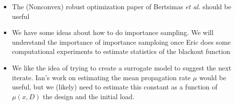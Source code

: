 \begin{itemize}
\item The (Nonconvex) robust optimization paper of Bertsimas {\it et
  al.} should be useful
\item We have some ideas about how to do importance sampling.  We will
  understand the importance of importance samploing once Eric does
  some computational experiments to estimate statistics of the
  blackout function
\item We like the idea of trying to create a surrogate model to
  suggest the next iterate.  Ian's work on estimating the mean
  propagation rate $\mu$ would be useful, but we (likely) need to
  estimate this constant as a function of $\mu(x,D)$ the design and
  the initial load.
\end{itemize}



